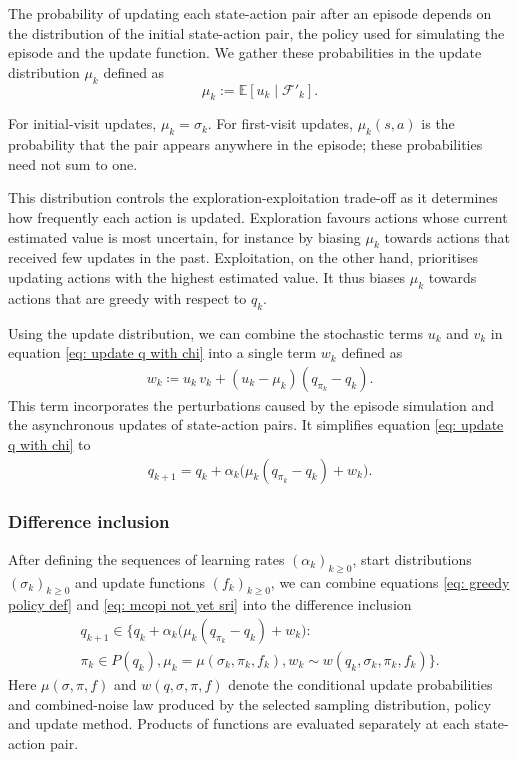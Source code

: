 \documentclass[twoside,11pt]{article}
\newcommand{\pol}{\pi}
\newcommand{\update}{\mu}
\newcommand{\start}{\sigma}
\newcommand{\grpol}{P}
\newcommand{\lrate}{\alpha}
\newcommand{\kpo}{{{k+1}}}
\DeclareRobustCommand{\reviewbarstart}{%
  \ifhmode %
    \vadjust{\vbox to 0pt{%
      \vskip-\ht\strutbox %
      \vskip-\dp\strutbox %
      \cbstart[\changebarwidth] %
      \vss %
    }}%
  \else %
    \cbstart[\changebarwidth]%
  \fi %
} %
\providecommand{\DIFadd}[1]{#1} %
\providecommand{\DIFaddbegin}{\reviewbarstart} %
\providecommand{\DIFaddend}{\protect\cbend} %
\def\DIFadd#1{#1}%
\def\DIFaddbegin{}%
\def\DIFaddend{}%
\begin{document}
The probability of updating each state-action pair after an episode depends on the distribution of the initial state-action pair, the policy used for simulating the episode and the update function.
We gather these probabilities in the update distribution $\mu_k$ defined as
 \DIFaddbegin \[
\DIFadd{\mu_k := \mathbb E }[ \DIFadd{u_k \mid \mathcal F'_k}] \DIFadd{.
}\]\DIFaddend 

\DIFaddbegin \DIFadd{For initial-visit updates, $\mu_k=\sigma_k$. For first-visit updates, $\mu_k(s,a)$ is the probability that the pair appears anywhere in the episode; these probabilities need not sum to one.
}\DIFaddend 

This distribution controls the exploration-exploitation trade-off
as it determines how frequently each action is updated.
Exploration favours actions whose current estimated value is most uncertain, for instance by biasing $\mu_k$ towards actions that received few updates in the past.
Exploitation, on the other hand, prioritises updating actions with the highest estimated value. It thus biases $\mu_k$ towards actions that are greedy with respect to $q_k$.

Using the update distribution,
we can combine the stochastic terms $u_k$ and $v_k$ in equation \eqref{eq: update q with chi} into a single term $w_k$ defined as
\begin{align}
\label{eq: definition combined noise}
    w_k
    \coloneqq
    u_k \, v_k + (u_k - \mu_k) ( q_{\pol_k} - q_k ) .
\end{align}
This term incorporates the perturbations caused by the episode simulation and the asynchronous updates of state-action pairs.
It simplifies equation \eqref{eq: update q with chi} to
\begin{align}
\label{eq: mcopi not yet sri}
    q_{k+1}
    =
    q_k + \lrate_k \big( \update_k ( q_{\pol_k} - q_k ) + w_k \big) .
\end{align}

 \subsubsection{Difference inclusion}

After defining the sequences of learning rates $(\lrate_k)_{k \ge 0}$, start distributions $(\start_k)_{k \ge 0}$ and update functions $(f_k)_{k \ge 0}$,
we can combine equations \eqref{eq: greedy policy def} and \eqref{eq: mcopi not yet sri} into the difference inclusion
 \DIFaddbegin \begin{multline}
\DIFadd{\label{eq: mcopi sa}
    q_\kpo
    \in
    \Big\{ q_k + \alpha_k \big( \mu_k(q_{\pol_k} - q_k) + w_k \big)
    :
    }\\
    \DIFadd{\pol_k \in \grpol(q_k),
    \update_k = \update(\start_k, \pol_k, f_k),
    w_k \sim w(q_k, \start_k, \pol_k, f_k)
    \Big\} .
}\end{multline}\DIFaddend 
 \DIFaddbegin \DIFadd{Here $\mu(\sigma,\pi,f)$ and $w(q,\sigma,\pi,f)$ denote the conditional update probabilities and combined-noise law produced by the selected sampling distribution, policy and update method. Products of functions are evaluated separately at each state-action pair.
}
\end{document}

